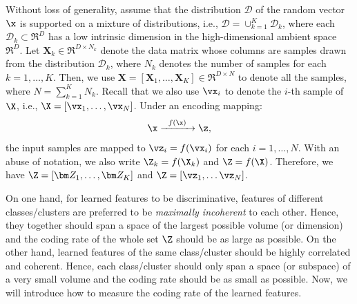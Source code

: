 \documentclass[../../book-main.tex]{subfiles}
\begin{document}

Without loss of generality, assume that the distribution $\mathcal D$ of the random vector $\x$ is supported on a mixture of distributions, i.e., $\mathcal D = \cup_{k=1}^K \mathcal{D}_k$,  where each $\mathcal{D}_k \subset \Re^D$ has a low intrinsic dimension in the high-dimensional ambient space $\Re^D$. Let $\bm X_k \in \Re^{D\times N_k}$ denote the data matrix whose columns are samples drawn from the distribution $\mathcal{D}_k$, where $N_k$ denotes the number of samples for each $k=1,\dots,K$. Then, we use $\bm X=[\bm X_1,\dots,\bm X_K] \in \Re^{D\times N}$ to denote all the samples, where $N=\sum_{k=1}^K N_k$. 
Recall that we also use $\vx_i$ to denote the $i$-th sample of $\X$, i.e., $\X=[\vx_1,\dots,\vx_N] $. Under an encoding mapping:
\begin{equation}
	\x   \xrightarrow{\hspace{2mm} f(\x)\hspace{2mm}} \z,
\end{equation}
the input samples are mapped to $\vz_i = f(\vx_i)$ for each $i=1,\dots,N$. With an abuse of notation, we also write $\Z_k = f(\X_k)$ and $\Z = f(\X)$. Therefore, we have $\Z = [\bm Z_1,\dots,\bm Z_K]$ and $\Z = [\vz_1,\dots\vz_N]$. 

On one hand, for learned features to be discriminative, features of different classes/clusters are preferred to be {\em maximally incoherent} to each other. Hence, they together should span a space of the largest possible volume (or dimension) and the coding rate of the whole set $\Z$ should be as large as possible. On the other hand, learned features of the same class/cluster should be highly correlated and coherent. Hence, each class/cluster should only span a space (or subspace) of a very small volume and the coding rate should be as small as possible. Now, we will introduce how to measure the coding rate of the learned features.  
\end{document}
